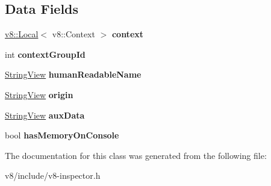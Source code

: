 \subsection*{Data Fields}
\begin{DoxyCompactItemize}
\item 
\mbox{\label{classv8__inspector_1_1V8ContextInfo_a24c69a2cb86febdcd30605f9edea8b21}} 
\mbox{\hyperlink{classv8_1_1Local}{v8\+::\+Local}}$<$ v8\+::\+Context $>$ {\bfseries context}
\item 
\mbox{\label{classv8__inspector_1_1V8ContextInfo_a4958fb8bfe5ec4aa77ebdfe29b1e9a30}} 
int {\bfseries context\+Group\+Id}
\item 
\mbox{\label{classv8__inspector_1_1V8ContextInfo_a393412db9d07a12be7b4bf8f3465b8fd}} 
\mbox{\hyperlink{classv8__inspector_1_1StringView}{String\+View}} {\bfseries human\+Readable\+Name}
\item 
\mbox{\label{classv8__inspector_1_1V8ContextInfo_acd3feac7585871ae24b2cf910140b743}} 
\mbox{\hyperlink{classv8__inspector_1_1StringView}{String\+View}} {\bfseries origin}
\item 
\mbox{\label{classv8__inspector_1_1V8ContextInfo_afda75b31c49cd9f4e664ec7068979d9a}} 
\mbox{\hyperlink{classv8__inspector_1_1StringView}{String\+View}} {\bfseries aux\+Data}
\item 
\mbox{\label{classv8__inspector_1_1V8ContextInfo_a2c523d93043e7f4b018c470dad60b41f}} 
bool {\bfseries has\+Memory\+On\+Console}
\end{DoxyCompactItemize}


The documentation for this class was generated from the following file\+:\begin{DoxyCompactItemize}
\item 
v8/include/v8-\/inspector.\+h\end{DoxyCompactItemize}
